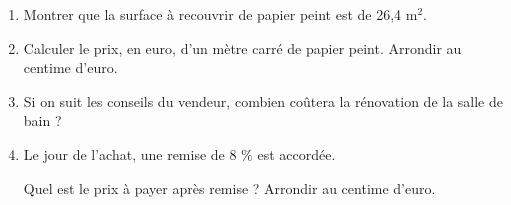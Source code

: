 	\begin{enumerate}
		\item Montrer que la surface à recouvrir de papier peint est de 26,4 m$^2$.
		
		\item Calculer le prix, en euro, d’un mètre carré de papier peint.
		Arrondir au centime d'euro.
		
		\item Si on suit les conseils du vendeur, combien coûtera la rénovation de la salle de bain ?
		
		\item Le jour de l'achat, une remise de 8 \% est accordée.
		
		Quel est le prix à payer après remise ? Arrondir au centime d'euro.
	\end{enumerate}

